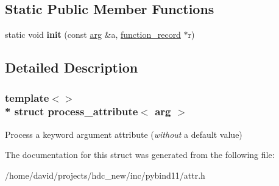 \subsection*{Static Public Member Functions}
\begin{DoxyCompactItemize}
\item 
static void {\bfseries init} (const \hyperlink{structarg}{arg} \&a, \hyperlink{structfunction__record}{function\+\_\+record} $\ast$r)\hypertarget{structprocess__attribute_3_01arg_01_4_a256bf466859197e079b902fb77c5d01c}{}\label{structprocess__attribute_3_01arg_01_4_a256bf466859197e079b902fb77c5d01c}

\end{DoxyCompactItemize}


\subsection{Detailed Description}
\subsubsection*{template$<$$>$\\*
struct process\+\_\+attribute$<$ arg $>$}

Process a keyword argument attribute ({\itshape without} a default value) 

The documentation for this struct was generated from the following file\+:\begin{DoxyCompactItemize}
\item 
/home/david/projects/hdc\+\_\+new/inc/pybind11/attr.\+h\end{DoxyCompactItemize}

